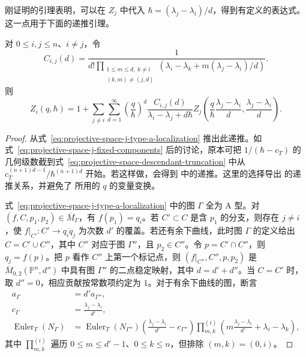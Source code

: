 刚证明的引理表明，可以在 $Z_j$ 中代入 $\hbar=(\lambda_j-\lambda_i)/d$，得到有定义的表达式。这一点用于下面的递推引理。
\begin{lemma}[递推引理]\label{lem:projective-space-j-recursion}
对 $0\le i,j\le n$、$i\ne j$，令
\[
C_{i,j}(d)=\frac1{d!\displaystyle\prod_{\substack{1\le m\le d,\ k\ne i\\(k,m)\ne(j,d)}}(\lambda_i-\lambda_k+m(\lambda_j-\lambda_i)/d)}.
\]
则
\[
Z_i(q,\hbar)=1+\sum_{j\ne i}\sum_{d=1}^{\infty}\left(\frac q\hbar\right)^d
\frac{C_{i,j}(d)}{\lambda_i-\lambda_j+d\hbar}
Z_j\left(\frac q\hbar\frac{\lambda_j-\lambda_i}{d},\frac{\lambda_j-\lambda_i}{d}\right).
\]
\end{lemma}
\begin{proof}
从式~\eqref{eq:projective-space-j-type-a-localization} 推出此递推。如式~\eqref{eq:projective-space-j-fixed-components} 后的讨论，原本可把 $1/(\hbar-c_T)$ 的几何级数截到式~\eqref{eq:projective-space-descendant-truncation} 中从 $c_T^{(n+1)d-1}/\hbar^{(n+1)d}$ 开始。若这样做，会得到  中的递推。这里的选择导出  的递推关系，并避免了  所用的 $q$ 的变量变换。

式~\eqref{eq:projective-space-j-type-a-localization} 中的图 $\Gamma$ 全为 A 型。对 $(f,C,p_1,p_2)\in\overline M_\Gamma$，有 $f(p_1)=q_i$。若 $C'\subset C$ 是含 $p_1$ 的分支，则存在 $j\ne i$，使 $f|_{C'}:C'\to\overline{q_iq_j}$ 为次数 $d'$ 的覆盖。若还有余下曲线，此时图 $\Gamma$ 的定义给出 $C=C'\cup C''$，其中 $C''$ 对应于图 $\Gamma''$，且 $p_2\in C''$。令 $p=C'\cap C''$，则 $q_j=f(p)$。把 $p$ 看作 $C''$ 上第一个标记点，则 $(f|_{C''},C'',p,p_2)$ 是
$\overline M_{0,2}(\mathbb P^n,d'')$ 中具有图 $\Gamma''$ 的二点稳定映射，其中 $d=d'+d''$。当 $C=C'$ 时，取 $d''=0$，相应贡献按常数项约定为 $1$。对于有余下曲线的图，断言
\begin{equation}\label{eq:projective-space-edge-removal-euler}
\begin{aligned}
a_\Gamma&=d'a_{\Gamma''},\\
c_\Gamma&=\frac{\lambda_j-\lambda_i}{d'},\\
\operatorname{Euler}_T(N_\Gamma)&=\operatorname{Euler}_T(N_{\Gamma''})
\left(\frac{\lambda_j-\lambda_i}{d'}-c_{\Gamma''}\right)
\prod_{m,k}^{(i)}\left(m\frac{\lambda_j-\lambda_i}{d'}+\lambda_i-\lambda_k\right),
\end{aligned}
\end{equation}
其中 $\prod_{m,k}^{(i)}$ 遍历 $0\le m\le d'-1$、$0\le k\le n$，但排除 $(m,k)=(0,i)$。


\end{proof}
